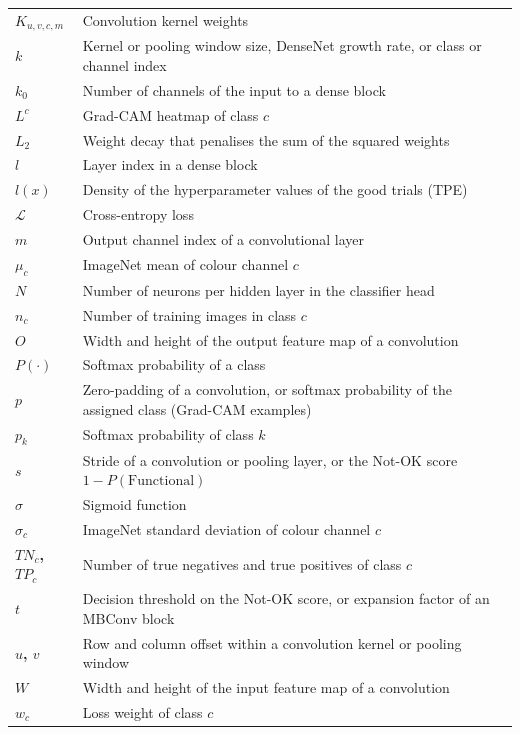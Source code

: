 \begin{longtable}{@{}>{\bfseries}lp{.7\linewidth}}
$K_{u,v,c,m}$ & Convolution kernel weights \\[1.0ex]
$k$ & Kernel or pooling window size, DenseNet growth rate, or class or channel index \\[1.0ex]
$k_0$ & Number of channels of the input to a dense block \\[1.0ex]
$L^c$ & Grad-CAM heatmap of class $c$ \\[1.0ex]
$L_2$ & Weight decay that penalises the sum of the squared weights \\[1.0ex]
$l$ & Layer index in a dense block \\[1.0ex]
$l(x)$ & Density of the hyperparameter values of the good trials (TPE) \\[1.0ex]
$\mathcal{L}$ & Cross-entropy loss \\[1.0ex]
$m$ & Output channel index of a convolutional layer \\[1.0ex]
$\mu_c$ & ImageNet mean of colour channel $c$ \\[1.0ex]
$N$ & Number of neurons per hidden layer in the classifier head \\[1.0ex]
$n_c$ & Number of training images in class $c$ \\[1.0ex]
$O$ & Width and height of the output feature map of a convolution \\[1.0ex]
$P(\cdot)$ & Softmax probability of a class \\[1.0ex]
$p$ & Zero-padding of a convolution, or softmax probability of the assigned class (Grad-CAM examples) \\[1.0ex]
$p_k$ & Softmax probability of class $k$ \\[1.0ex]
$s$ & Stride of a convolution or pooling layer, or the Not-OK score $1 - P(\mathrm{Functional})$ \\[1.0ex]
$\sigma$ & Sigmoid function \\[1.0ex]
$\sigma_c$ & ImageNet standard deviation of colour channel $c$ \\[1.0ex]
$TN_c$, $TP_c$ & Number of true negatives and true positives of class $c$ \\[1.0ex]
$t$ & Decision threshold on the Not-OK score, or expansion factor of an MBConv block \\[1.0ex]
$u$, $v$ & Row and column offset within a convolution kernel or pooling window \\[1.0ex]
$W$ & Width and height of the input feature map of a convolution \\[1.0ex]
$w_c$ & Loss weight of class $c$ \\[1.0ex]

\end{longtable}
